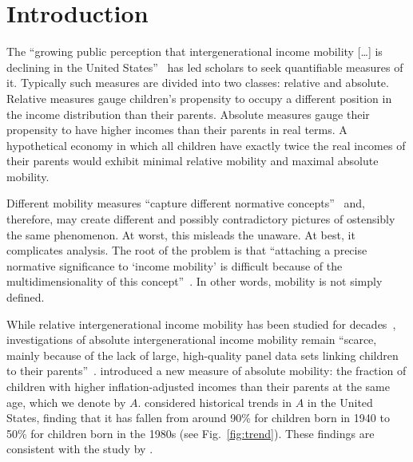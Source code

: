 \documentclass[12pt,a4paper]{article}
\newcommand{\fref}[1]{Fig.~\ref{fig:#1}}
\numberwithin{equation}{section}
\begin{document}
\doublespacing

\section{Introduction} \label{sec:introduction}

The ``growing public perception that intergenerational income mobility [\ldots] is declining in the United States''~\citep[p.~141]{chetty2014united} has led scholars to seek quantifiable measures of it. Typically such measures are divided into two classes: relative and absolute. Relative measures gauge children's propensity to occupy a different position in the income distribution than their parents. Absolute measures gauge their propensity to have higher incomes than their parents in real terms. A hypothetical economy in which all children have exactly twice the real incomes of their parents would exhibit minimal relative mobility and maximal absolute mobility. 

Different mobility measures ``capture different normative concepts''~\citep[p.~1560]{chetty2014land} and, therefore, may create different and possibly contradictory pictures of ostensibly the same phenomenon. At worst, this misleads the unaware. At best, it complicates analysis. The root of the problem is that ``attaching a precise normative significance to `income mobility' is difficult because of the multidimensionality of this concept''~\citep[p.~588]{fields1999measurement}. In other words, mobility is not simply defined.

While relative intergenerational income mobility has been studied for decades~\citep{becker1979equilibrium,borjas1992ethnic,piketty2000theories,mazumder2005fortunate,aaronson2008intergenerational,lee2009trends,hauser2010intergenerational,corak2013income,chetty2014united,berman2016understanding}, investigations of absolute intergenerational income mobility remain ``scarce, mainly because of the lack of large, high-quality panel data sets linking children to their parents''~\citep[p.~398]{chetty2017fading}. \citet[p.~1563]{chetty2014land} introduced a new measure of absolute mobility: the fraction of children with higher inflation-adjusted incomes than their parents at the same age, which we denote by $A$. \citet{chetty2017fading} considered historical trends in $A$ in the United States, finding that it has fallen from around 90\% for children born in 1940 to 50\% for children born in the 1980s (see \fref{trend}). These findings are consistent with the study by \citet{isaacs2007economic}.
\end{document}
